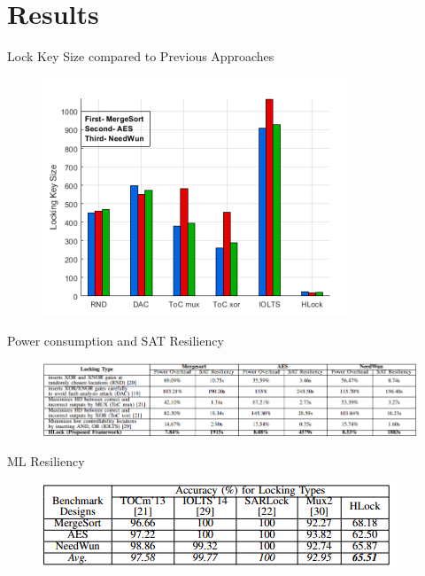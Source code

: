 \documentclass[xcolor=dvipsnames]{beamer}
\begin{document}
    \section{Results}

    \begin{frame}{Lock Key Size compared to Previous Approaches}

        \begin{figure}
            \includegraphics{KeySizeResult.PNG}
        \end{figure}
        
    \end{frame}

    \begin{frame}{Power consumption and SAT Resiliency}
        \begin{figure}
            \includegraphics[scale=0.6]{Result_SAT_Power.PNG}
        \end{figure}
    \end{frame}

    \begin{frame}{ML Resiliency}

        \begin{figure}
            \includegraphics{Result_ML.PNG}
        \end{figure}
        
    \end{frame}
\end{document}
